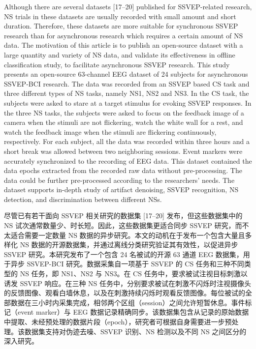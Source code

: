 \documentclass[11pt]{ctexart}
\newenvironment{en}{\begin{enbox}\color{black!85}}{\end{enbox}}
\newenvironment{zh}{\begin{zhbox}}{\end{zhbox}}
\begin{document}
\begin{en}
Although there are several datasets [17--20] published for SSVEP-related research, NS trials in these datasets are usually recorded with small amount and short duration. Therefore, these datasets are more suitable for synchronous SSVEP research than for asynchronous research which requires a certain amount of NS data. The motivation of this article is to publish an open-source dataset with a large quantity and variety of NS data, and validate its effectiveness in offline classification study, to facilitate asynchronous SSVEP research. This study presents an open-source 63-channel EEG dataset of 24 subjects for asynchronous SSVEP-BCI research. The data was recorded from an SSVEP based CS task and three different types of NS tasks, namely NS1, NS2 and NS3. In the CS task, the subjects were asked to stare at a target stimulus for evoking SSVEP responses. In the three NS tasks, the subjects were asked to focus on the feedback image of a camera when the stimuli are not flickering, watch the white wall for a rest, and watch the feedback image when the stimuli are flickering continuously, respectively. For each subject, all the data was recorded within three hours and a short break was allowed between two neighboring sessions. Event markers were accurately synchronized to the recording of EEG data. This dataset contained the data epochs extracted from the recorded raw data without pre-processing. The data could be further pre-processed according to the researchers' needs. The dataset supports in-depth study of artifact denoising, SSVEP recognition, NS detection, and discrimination between different NSs.
\end{en}
\begin{zh}
尽管已有若干面向 SSVEP 相关研究的数据集 [17--20] 发布，但这些数据集中的 NS 试次通常数量少、时长短。因此，这些数据集更适合同步 SSVEP 研究，而不太适合需要一定数量 NS 数据的异步研究。本文的动机在于发布一个包含大量且多样化 NS 数据的开源数据集，并通过离线分类研究验证其有效性，以促进异步 SSVEP 研究。本研究发布了一个包含 24 名被试的开源 63 通道 EEG 数据集，用于异步 SSVEP-BCI 研究。数据采集自一项基于 SSVEP 的 CS 任务和三种不同类型的 NS 任务，即 NS1、NS2 与 NS3。在 CS 任务中，要求被试注视目标刺激以诱发 SSVEP 响应。在三种 NS 任务中，分别要求被试在刺激不闪烁时注视摄像头的反馈图像、观看白墙休息，以及在刺激持续闪烁时观看反馈图像。每位被试的全部数据在三小时内采集完成，相邻两个区组（session）之间允许短暂休息。事件标记（event marker）与 EEG 数据记录精确同步。该数据集包含从记录的原始数据中提取、未经预处理的数据片段（epoch），研究者可根据自身需要进一步预处理。该数据集支持对伪迹去噪、SSVEP 识别、NS 检测以及不同 NS 之间区分的深入研究。
\end{zh}
\end{document}
